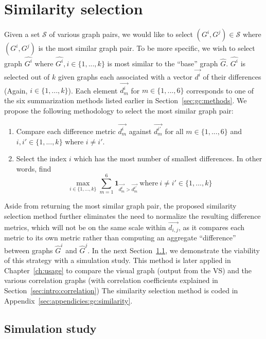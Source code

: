 \section{Similarity selection}
\label{sec:gc:simulations}

Given a set $\mathcal{S}$ of various graph pairs, we would like to select 
$(G^i,G^j) \in \mathcal{S}$ where $(G^i,G^j)$ is the most similar graph pair. 
To be more specific, we wish to select graph $\hat{G^i}$ where $\hat{G^i}, i 
\in \{1,...,k\}$ is most similar to the ``base'' graph $\hat{G}$. $\hat{G^i}$ 
is selected out of $k$ given graphs each associated with a vector 
$\overrightarrow{d^{i}}$ of their differences (Again, $i \in \{1,...,k\}$). 
Each element $\overrightarrow{d^{i}_m}$ for $m \in 
\{1,...,6\}$ corresponds to one of the six summarization methods listed 
earlier in Section~\ref{sec:gc:methods}. 
We propose the following methodology to select the most similar graph pair:

\tablespacing
\begin{enumerate}
	\item Compare each difference metric $\overrightarrow{d^{i}_m}$ against 
	$\overrightarrow{d^{i'}_m}$ for all $m \in \{1,...,6\}$ and $i,i' \in 
	\{1,...,k\}$ where $i \neq i'$. 
	\item Select the index $i$ which has the most number of smallest 
	differences. In other words, find
	$$\max\limits_{i \in \{1,...,k\}} 
	\sum\limits^{6}_{m=1} \textbf{1}_{\overrightarrow{d^{i}_m} > 
	\overrightarrow{d^{i'}_m}} \ \text{where} \ i \neq i' \in \{1,...,k\}$$
\end{enumerate}
\bodyspacing

Aside from returning the most similar graph pair, the proposed similarity 
selection method further eliminates the need to normalize the resulting 
difference metrics, which will not be on the same scale within 
$\overrightarrow{d_{i,j}}$, as it compares each metric to its own metric rather 
than computing an aggregate ``difference'' between graphs $\hat{G}^i$ and 
$\hat{G}^j$. In the next Section~\ref{sec:gc:simulations:algorithm}, we 
demonstrate the viability of this strategy with a simulation study. 
This method is later applied in Chapter~\ref{ch:usage} to compare the visual 
graph (output from the VS) and the various correlation graphs (with correlation 
coefficients explained in Section~\ref{sec:intro:correlation})
The similarity selection method is coded in 
Appendix~\ref{sec:appendicies:gc:similarity}.

\subsection{Simulation study}
\label{sec:gc:simulations:algorithm}

